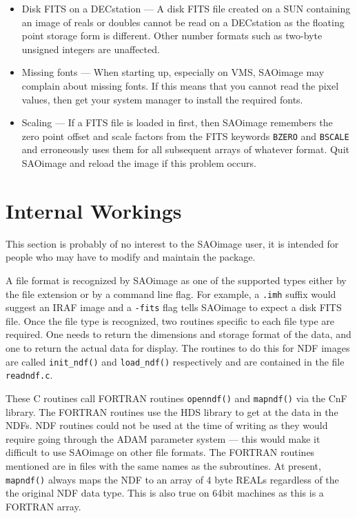 \begin{itemize}
\item{Disk FITS on a DECstation --- A disk FITS file created on a SUN
containing an image of reals or doubles cannot be read on a DECstation
as the floating point storage form is different. Other number formats
such as two-byte unsigned integers are unaffected.}

\item{Missing fonts --- When starting up, especially on VMS, SAOimage may
complain about missing fonts. If this means that you cannot read the
pixel values, then get your system manager to install the required
fonts.}

\item{Scaling --- If a FITS file is loaded in first, then SAOimage
remembers the zero point offset and scale factors from the FITS
keywords {\tt BZERO} and {\tt BSCALE} and erroneously uses them
for all subsequent arrays of whatever format. Quit SAOimage and reload
the image if this problem occurs.}

\end{itemize}

\section{Internal Workings}

This section is probably of no interest to the SAOimage user, it is intended
for people who may have to modify and maintain the package.

A file format is recognized by SAOimage as one of the supported types
either by the file extension or by a command line flag. For example, a
{\tt .imh} suffix would suggest an IRAF image and a {\tt -fits} flag
tells SAOimage to expect a disk FITS file. Once the file type is
recognized, two routines specific to each file type are required. One
needs to return the dimensions and storage format of the data, and one
to return the actual data for display. The routines to do this for NDF
images are called {\tt init\_ndf()} and {\tt load\_ndf()} respectively
and are contained in the file {\tt readndf.c}.

These C routines call FORTRAN routines {\tt openndf()} and {\tt mapndf()}
via the CnF
library. The FORTRAN routines use the HDS library to get at the data in the
NDFs.  NDF routines could not be used at the time of writing as they would
require going through the ADAM parameter system --- this would make it
difficult to use SAOimage on other file formats. The FORTRAN routines
mentioned are in files with the same names as the subroutines. At present,
{\tt mapndf()} always maps the NDF to an array of 4 byte REALs regardless
of the
the original NDF data type.  This is also true on 64bit machines as this is
a FORTRAN array.

